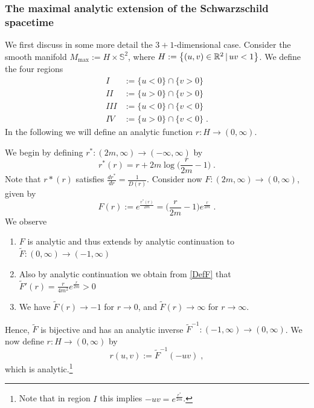 \documentclass[reqno]{article}
\newcommand{\R}{\mathbb{R}}
\newcommand{\Mmax}{M_{\mathrm{max}}}
\begin{document}
\subsubsection*{The maximal analytic extension of the Schwarzschild spacetime}
\label{MaxAna}

We first discuss in some more detail the $3+1$-dimensional case. Consider the smooth manifold $\Mmax := H \times \mathbb{S}^2$, where $H := \big{\{} (u,v) \in \R^2 \, | \, uv <1\big{\}}$. We define the four regions
\begin{align*}
I &:= \{u < 0 \} \cap \{ v > 0\} \\
II &:= \{u > 0 \} \cap \{ v > 0\} \\
III &:= \{u < 0 \} \cap \{ v < 0\} \\
IV &:= \{u > 0 \} \cap \{ v < 0\} \;.
\end{align*}
In the following we will define an analytic function $r : H \to (0,\infty)$.

We begin by defining $r^* : (2m, \infty) \to (-\infty, \infty)$ by
\begin{equation}
\label{RStar}
r^*(r) = r + 2m\log\big( \frac{r}{2m} -1\big) \;.
\end{equation}
Note that $r*(r)$ satisfies $\frac{dr^*}{dr} = \frac{1}{D(r)}$. Consider now $F: (2m, \infty) \to (0, \infty)$, given by
\begin{equation}
\label{DefF}
F(r) := e^{\frac{r^*(r)}{2m}} = \big(\frac{r}{2m} -1 \big) e^{\frac{r}{2m}} \;.
\end{equation}
We observe
\begin{enumerate}
\item $F$ is analytic and thus extends by analytic continuation to $\tilde{F} : (0,\infty) \to (-1, \infty)$
\item Also by analytic continuation we obtain from \eqref{DefF} that $\tilde{F}'(r) = \frac{r}{4m^2} e^{\frac{r}{2m}} >0$
\item We have $\tilde{F}(r) \to -1$ for $r \to 0$, and $\tilde{F}(r) \to \infty$ for $r \to \infty$.
\end{enumerate}
Hence, $\tilde{F}$ is bijective and has an analytic inverse $\tilde{F}^{-1} : (-1, \infty) \to (0, \infty)$. We now define $r: H \to (0, \infty)$ by
\begin{equation*}
r(u,v) := \tilde{F}^{-1}(-uv)\;,
\end{equation*}
which is analytic.\footnote{Note that in region $I$ this implies $-uv = e^{\frac{r^*}{2m}}$.}
\end{document}
